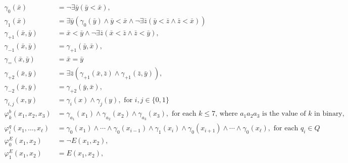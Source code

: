 \begin{align*}
\gamma_{0}(\bar{x}) &= \neg\exists\bar{y}(\bar{y}<\bar{x}),\\
\gamma_{1}(\bar{x}) &= \exists\bar{y}(\gamma_{0}(\bar{y})\wedge \bar{y} < \bar{x} \wedge \neg\exists\bar{z}(\bar{y}<\bar{z}\wedge\bar{z}<\bar{x}))\\
\gamma_{+1}(\bar{x},\bar{y}) &= \bar{x} < \bar{y} \wedge \neg\exists \bar{z}(\bar{x}<\bar{z} \wedge \bar{z}<\bar{y}), \\
\gamma_{-1}(\bar{x},\bar{y}) &= \gamma_{+1}(\bar{y},\bar{x}),\\
\gamma_{=}(\bar{x},\bar{y}) &= \bar{x} = \bar{y} \\
\gamma_{+2}(\bar{x},\bar{y}) &= \exists\bar{z}(\gamma_{+1}(\bar{x},\bar{z}) \wedge \gamma_{+1}(\bar{z},\bar{y})),\\
\gamma_{-2}(\bar{x},\bar{y}) &= \gamma_{+2}(\bar{y},\bar{x}),\\
\gamma_{i,j}(x,y) &= \gamma_i(x) \wedge \gamma_j(y),\text{ for $i,j \in\{0,1\}$}\\
\varphi^b_k(x_1,x_2,x_3) &= \gamma_{a_1}(x_1) \wedge \gamma_{a_2}(x_2) \wedge \gamma_{a_3}(x_3),\text{ for each $k \leq 7$, where $a_1a_2a_3$ is the value of $k$ in binary}, \\
\varphi^q_i(x_1,\ldots,x_{\ell}) &= \gamma_0(x_1) \wedge \cdots \wedge \gamma_0(x_{i-1}) \wedge \gamma_1(x_i) \wedge \gamma_0(x_{i+1}) \wedge \cdots \wedge \gamma_0(x_{\ell}), \text{ for each } q_i\in Q\\
\varphi^E_0(x_1,x_2) &= \neg E(x_1,x_2),\\		\varphi^E_1(x_1,x_2) &= E(x_1,x_2),\\
\end{align*}

